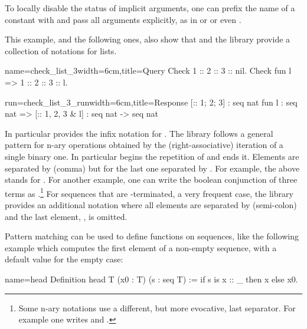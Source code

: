 To locally disable the
status of implicit arguments, one can prefix the name of a
constant with  and pass all arguments explicitly, as in
 or  or even
.

This example, and the following ones, also show
that \Coq{} and the \mcbMC{} library provide
a collection of notations for lists.

\begin{coq}{name=check_list_3}{width=6cm,title=Query}
Check 1 :: 2 :: 3 :: nil.
Check fun l => 1 :: 2 :: 3 :: l.
$~$
\end{coq}
\begin{coqout}{run=check_list_3_run}{width=6cm,title=Response}
[:: 1; 2; 3] : seq nat
fun l : seq nat => [:: 1, 2, 3 & l]
  : seq nat -> seq nat
\end{coqout}
\index[coq]{\C{[:: .. , .. & ..]}}

In particular \Coq{} provides the infix notation \C{::} for
.  The \mcbMC{} library follows a general pattern for
n-ary operations obtained by the (right-associative)
iteration of a single binary one. In
particular \C{[::} begins the repetition
of \C{::} and \C{]} ends it.  Elements are separated by \C{,} (comma)
but for the last one separated by \C{&}.
For example, the above \C{[:: 1; 2; 3 & l]} stands for
.
For another example, one
can write  the boolean conjunction
of three terms as .\footnote{Some n-ary
  notations use a different, but more evocative, last separator.  For
  example one writes \C{[|| b1, b2 | b3]} and \C{[==> b1, b2 => b3]}.}
\index[coq]{\C{["|"| .. , .. "| ..]}}
\index[coq]{\C{[&& .. , .. & ..]}}
\index[coq]{\C{[==> .. , .. => ..]}}
For sequences that are -terminated, a very frequent case,
the \mcbMC{} library provides an additional notation where all elements are
separated by \C{;} (semi-colon) and the last element, ,
is omitted.
\index[coq]{\C{[seq .. ; ..]}}

Pattern matching can be used to define functions on sequences, like
the following example which computes the first element of a non-empty
sequence, with a default value for the empty case:

\begin{coq}{name=head}{}
Definition head T (x0 : T) (s : seq T) := if s is x :: _ then x else x0.
\end{coq}

